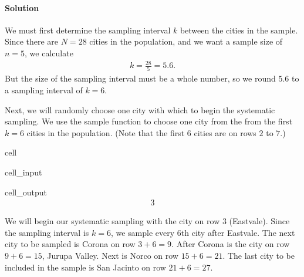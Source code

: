 \documentclass[letterpaper,10pt,english]{jupyterBook}
\begin{document}
\paragraph{Solution}
\label{\detokenize{Ch1 Sampling and Data/1.3 Sampling Techniques:id7}}
\sphinxAtStartPar
We must first determine the sampling interval \(k\) between the cities in the sample. Since there are \(N = 28\) cities in the population, and we want a sample size of \(n = 5\), we calculate
\begin{equation*}
\begin{split} k = \frac{28}{5} = 5.6. \end{split}
\end{equation*}
\sphinxAtStartPar
But the size of the sampling interval must be a whole number, so we round \(5.6\) to a sampling interval of \(k = 6\).

\sphinxAtStartPar
Next, we will randomly choose one city with which to begin the systematic sampling. We use the sample function to choose one city from the from the first \(k = 6\) cities in the population. (Note that the first \(6\) cities are on rows \(2\) to \(7\).)

\begin{sphinxuseclass}{cell}\begin{sphinxVerbatimInput}

\begin{sphinxuseclass}{cell_input}
\begin{sphinxVerbatim}[commandchars=\\\{\}]
\end{sphinxVerbatim}

\end{sphinxuseclass}\end{sphinxVerbatimInput}
\begin{sphinxVerbatimOutput}

\begin{sphinxuseclass}{cell_output}\begin{equation*}
\begin{split}3\end{split}
\end{equation*}
\end{sphinxuseclass}\end{sphinxVerbatimOutput}

\end{sphinxuseclass}
\sphinxAtStartPar
We will begin our systematic sampling with the city on row \(3\) (Eastvale). Since the sampling interval is \(k = 6\), we sample every \(6\)th city after Eastvale. The next city to be sampled is Corona on row \(3 + 6 = 9\). After Corona is the city on row \(9 + 6 = 15\), Jurupa Valley. Next is Norco on row \(15 + 6 = 21\). The last city to be included in the sample is San Jacinto on row \(21 + 6 = 27\).
\end{document}
